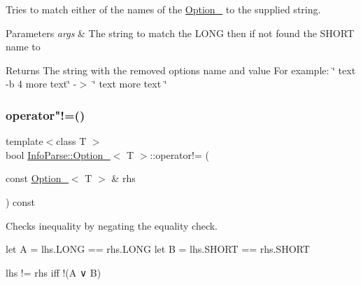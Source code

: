 Tries to match either of the names of the \mbox{\hyperlink{class_info_parse_1_1_option__}{Option\+\_\+}} to the supplied string.


\begin{DoxyParams}{Parameters}
{\em args}
    & The string to match the L\+O\+NG then if not found the S\+H\+O\+RT name to \\
    \hline
\end{DoxyParams}
\begin{DoxyReturn}{Returns}
    The string with the removed options\textquotesingle{} name and value For example\+: \char`\"{} text -\/b 4 more text\char`\"{} -\/$>$ \char`\"{} text more text \char`\"{}
\end{DoxyReturn}
\mbox{\label{class_info_parse_1_1_option___a4b8f64ccc99c927b0c28cd5e58bfc54b}}
\subsubsection{\texorpdfstring{operator"!=()}{operator!=()}}
{\footnotesize\ttfamily template$<$class T $>$ \\
bool \mbox{\hyperlink{class_info_parse_1_1_option__}{Info\+Parse\+::\+Option\+\_\+}}$<$ T $>$\+::operator!= (\begin{DoxyParamCaption}
                                                                                                                 \item[{const \mbox{\hyperlink{class_info_parse_1_1_option__}{Option\+\_\+}}$<$ T $>$ \&}]{rhs }
\end{DoxyParamCaption}) const}



Checks inequality by negating the equality check.

let A = lhs.\+L\+O\+NG == rhs.\+L\+O\+NG let B = lhs.\+S\+H\+O\+RT == rhs.\+S\+H\+O\+RT

lhs != rhs iff !(A ∨ B) \mbox{\label{class_info_parse_1_1_option___a49e2c6e87075ba1c1c75518317400e76}}
